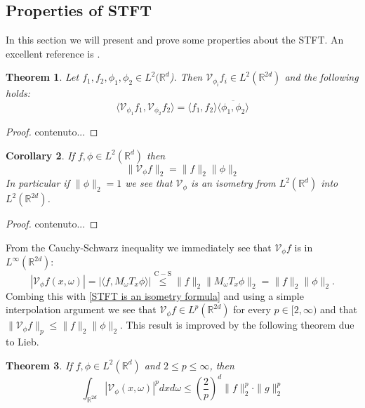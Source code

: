 \documentclass[corpo=11pt, stile=classica, tipotesi=custom,
greek, evenboxes, english]{toptesi}
\numberwithin{equation}{chapter}
\newtheorem{teo}{Theorem}[chapter] %
\newtheorem{cor}[teo]{Corollary}
\theoremstyle{remark}
\newcommand{\R}{\mathbb{R}} %
\newcommand{\V}{\mathcal{V}} %
\begin{document}
\subsection{Properties of STFT}
In this section we will present and prove some properties about the STFT. An excellent reference is \cite{grochenig}.
\begin{teo}\label{orthogonality relations theorem}
	Let $f_1,f_2,\phi_1,\phi_2 \in L^2(\R^d$). Then $\V_{\phi_i}f_i \in L^2(\R^{2d})$ and the following holds:
	\begin{equation}\label{orthogonality relation formula}
		\langle \V_{\phi_1} f_1, \V_{\phi_2} f_2 \rangle = \langle f_1, f_2 \rangle \overline{\langle \phi_1, \phi_2 \rangle}
	\end{equation}
\end{teo}
\begin{proof}
	contenuto...
\end{proof}
\begin{cor}
	If $f, \phi \in L^2(\R^d)$ then
	\begin{equation}\label{STFT is an isometry formula}
		\| \V_{\phi} f\|_2 = \| f \|_2 \| \phi \|_2
	\end{equation} 
	In particular if $\| \phi \|_2 = 1$ we see that $\V_{\phi}$ is an isometry from $L^2(\R^d)$ into $L^2(\R^{2d})$.
\end{cor}
\begin{proof}
	contenuto...
\end{proof}
From the Cauchy-Schwarz inequality we immediately see that $\V_{\phi} f$ is in $L^{\infty}(\R^{2d})$:
\begin{equation}\label{STFT is bounded}
	|\V_{\phi} f(x,\omega)| = |\langle f, M_{\omega} T_x \phi\rangle| \overset{\mathrm{C-S}}{\leq} \|f\|_2 \|M_{\omega}T_x \phi\|_2 = \|f\|_2 \|\phi\|_2.
\end{equation}
Combing this with \eqref{STFT is an isometry formula} and using a simple interpolation argument we see that $\V_{\phi}f \in L^p(\R^{2d})$ for every $p \in [2,\infty)$ and that $\|\V_{\phi}f\|_p \leq \|f\|_2 \|\phi\|_2$. This result is improved by the following theorem due to Lieb.
\begin{teo}\label{Lieb's inequality}
	If $f,\phi \in L^2(\R^d)$ and $2 \leq p \leq \infty$, then
	\begin{equation}\label{Lieb's inequality formula}
		\int_{\R^{2d}} |\V_{\phi}(x,\omega)|^p dxd\omega \leq \left(\dfrac{2}{p}\right)^d \|f\|_2^p \cdot \|g\|_2^p
	\end{equation}
\end{teo}
\end{document}

